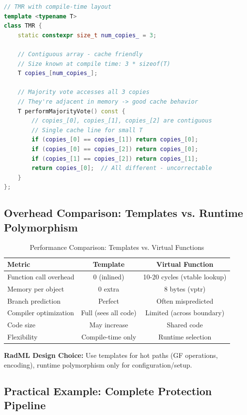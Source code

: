 \documentclass[11pt,a4paper]{article}
\begin{document}
\begin{lstlisting}[language=C++, basicstyle=\small\ttfamily]
// TMR with compile-time layout
template <typename T>
class TMR {
    static constexpr size_t num_copies_ = 3;

    // Contiguous array - cache friendly
    // Size known at compile time: 3 * sizeof(T)
    T copies_[num_copies_];

    // Majority vote accesses all 3 copies
    // They're adjacent in memory -> good cache behavior
    T performMajorityVote() const {
        // copies_[0], copies_[1], copies_[2] are contiguous
        // Single cache line for small T
        if (copies_[0] == copies_[1]) return copies_[0];
        if (copies_[0] == copies_[2]) return copies_[0];
        if (copies_[1] == copies_[2]) return copies_[1];
        return copies_[0];  // All different - uncorrectable
    }
};
\end{lstlisting}

\subsection{Overhead Comparison: Templates vs. Runtime Polymorphism}

\begin{table}[htbp]
\centering
\caption{Performance Comparison: Templates vs. Virtual Functions}
\begin{tabular}{@{}lcc@{}}
\toprule
\textbf{Metric} & \textbf{Template} & \textbf{Virtual Function} \\ \midrule
Function call overhead & 0 (inlined) & 10-20 cycles (vtable lookup) \\
Memory per object & 0 extra & 8 bytes (vptr) \\
Branch prediction & Perfect & Often mispredicted \\
Compiler optimization & Full (sees all code) & Limited (across boundary) \\
Code size & May increase & Shared code \\
Flexibility & Compile-time only & Runtime selection \\
\bottomrule
\end{tabular}
\end{table}

\textbf{RadML Design Choice:} Use templates for hot paths (GF operations, encoding), runtime polymorphism only for configuration/setup.

\subsection{Practical Example: Complete Protection Pipeline}
\end{document}
